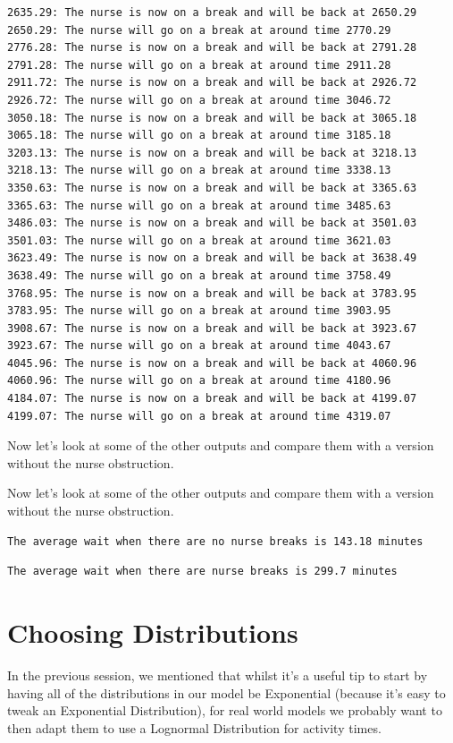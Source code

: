 \documentclass[
  letterpaper,
  DIV=11,
  numbers=noendperiod]{scrreprt}
\begin{document}
\begin{verbatim}
2635.29: The nurse is now on a break and will be back at 2650.29
2650.29: The nurse will go on a break at around time 2770.29
2776.28: The nurse is now on a break and will be back at 2791.28
2791.28: The nurse will go on a break at around time 2911.28
2911.72: The nurse is now on a break and will be back at 2926.72
2926.72: The nurse will go on a break at around time 3046.72
3050.18: The nurse is now on a break and will be back at 3065.18
3065.18: The nurse will go on a break at around time 3185.18
3203.13: The nurse is now on a break and will be back at 3218.13
3218.13: The nurse will go on a break at around time 3338.13
3350.63: The nurse is now on a break and will be back at 3365.63
3365.63: The nurse will go on a break at around time 3485.63
3486.03: The nurse is now on a break and will be back at 3501.03
3501.03: The nurse will go on a break at around time 3621.03
3623.49: The nurse is now on a break and will be back at 3638.49
3638.49: The nurse will go on a break at around time 3758.49
3768.95: The nurse is now on a break and will be back at 3783.95
3783.95: The nurse will go on a break at around time 3903.95
3908.67: The nurse is now on a break and will be back at 3923.67
3923.67: The nurse will go on a break at around time 4043.67
4045.96: The nurse is now on a break and will be back at 4060.96
4060.96: The nurse will go on a break at around time 4180.96
4184.07: The nurse is now on a break and will be back at 4199.07
4199.07: The nurse will go on a break at around time 4319.07
\end{verbatim}

Now let's look at some of the other outputs and compare them with a
version without the nurse obstruction.

Now let's look at some of the other outputs and compare them with a
version without the nurse obstruction.

\begin{verbatim}
The average wait when there are no nurse breaks is 143.18 minutes
\end{verbatim}

\begin{verbatim}
The average wait when there are nurse breaks is 299.7 minutes
\end{verbatim}

\chapter{Choosing Distributions}\label{sec-distributions}

In the previous session, we mentioned that whilst it's a useful tip to
start by having all of the distributions in our model be Exponential
(because it's easy to tweak an Exponential Distribution), for real world
models we probably want to then adapt them to use a Lognormal
Distribution for activity times.
\end{document}
